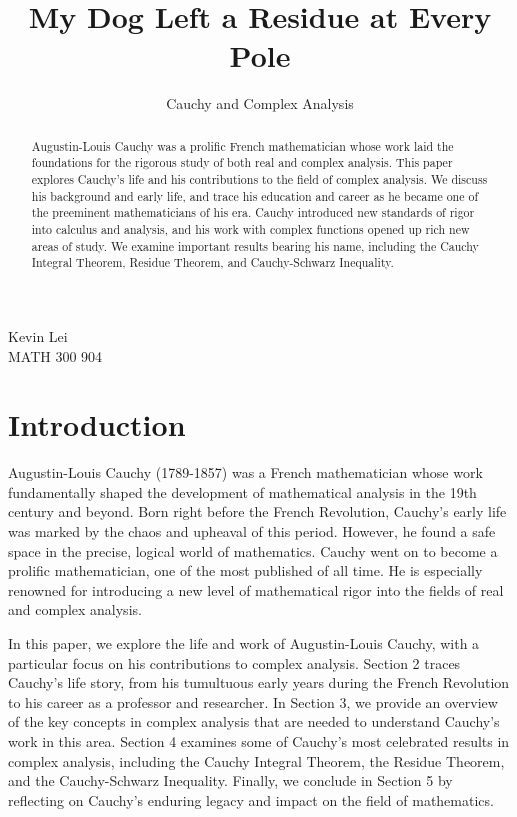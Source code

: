 \documentclass[12pt,letterpaper]{article}
\title{My Dog Left a Residue at Every Pole}
\author{Cauchy and Complex Analysis}
\date{}
\begin{document}
\begin{titlepage}
\maketitle
\thispagestyle{empty}
\begin{center}
    Kevin Lei \\
    MATH 300 904
\end{center}
\begin{abstract}
    Augustin-Louis Cauchy was a prolific French mathematician whose work laid the foundations for the rigorous study of both real and complex analysis. 
    This paper explores Cauchy's life and his contributions to the field of complex analysis. 
    We discuss his background and early life, and trace his education and career as he became one of the preeminent mathematicians of his era. 
    Cauchy introduced new standards of rigor into calculus and analysis, and his work with complex functions opened up rich new areas of study. 
    We examine important results bearing his name, including the Cauchy Integral Theorem, Residue Theorem, and Cauchy-Schwarz Inequality.
\end{abstract}
\end{titlepage}

\newpage
\thispagestyle{empty}
\tableofcontents

\newpage
\setcounter{page}{1}

\section{Introduction}
Augustin-Louis Cauchy (1789-1857) was a French mathematician whose work fundamentally shaped the development of mathematical analysis in the 19th century and beyond. 
Born right before the French Revolution, Cauchy's early life was marked by the chaos and upheaval of this period. 
However, he found a safe space in the precise, logical world of mathematics. 
Cauchy went on to become a prolific mathematician, one of the most published of all time.
He is especially renowned for introducing a new level of mathematical rigor into the fields of real and complex analysis.

In this paper, we explore the life and work of Augustin-Louis Cauchy, with a particular focus on his contributions to complex analysis. 
Section 2 traces Cauchy's life story, from his tumultuous early years during the French Revolution to his career as a professor and researcher. 
In Section 3, we provide an overview of the key concepts in complex analysis that are needed to understand Cauchy's work in this area. 
Section 4 examines some of Cauchy's most celebrated results in complex analysis, including the Cauchy Integral Theorem, the Residue Theorem, and the Cauchy-Schwarz Inequality. 
Finally, we conclude in Section 5 by reflecting on Cauchy's enduring legacy and impact on the field of mathematics.
\end{document}
